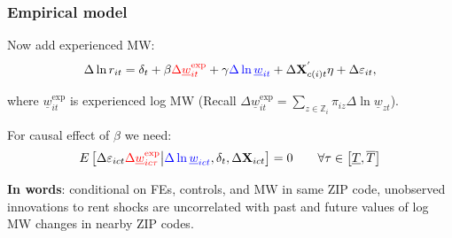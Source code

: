 \documentclass[aspectratio=169, t]{beamer}
\newcommand{\MW}{\underline{w}}
\begin{document}
\begin{frame}
	\frametitle{Empirical model}
		
	Now add experienced MW:
	$$
	\Delta \ln r_{it} = \delta_t +
	    \beta {\color{red}\Delta \MW^{\text{exp}}_{it}} +
		\gamma {\color{blue} \Delta \ln \MW_{it}} + 
		\Delta \mathbf{X}^{'}_{c(i)t} \eta + 
		\Delta \varepsilon_{it} ,
	$$
	
	where $\MW^{\text{exp}}_{it}$ is experienced log MW {\small (Recall 
	$\Delta \MW^{\text{exp}}_{it} = \sum_{z \in \mathbb{Z}_i} \pi_{i z} \Delta 
	\ln \MW_{zt}$)}.

	\pause
	\vspace{2mm}
	For causal effect of $\beta$ we need:
	$$
	E \left[\Delta \varepsilon_{ict} {\color{red} \Delta 
	\MW^{\text{exp}}_{ic\tau}} 
	\big| {\color{blue}\Delta \ln \MW_{ict}}, \delta_t, \Delta 
	\mathbf{X}_{ict} \right] = 0
	\quad \quad \forall \tau \in \left[ \underline{T}, \overline{T} \right]
	$$
	
	\pause
	\vspace{2mm}
	\textbf{In words}: conditional on FEs, controls, and {\color{blue} MW in same ZIP 
	code}, unobserved innovations to rent shocks are uncorrelated with past and future 
	values of log MW changes {\color{red} in nearby ZIP codes}.
\end{frame}
\end{document}
